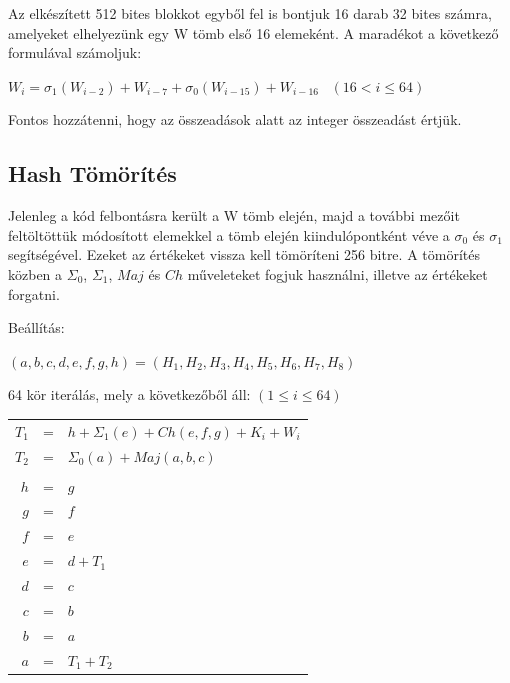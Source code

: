 Az elkészített 512 bites blokkot egyből fel is bontjuk 16 darab 32 bites számra, amelyeket elhelyezünk egy W tömb első 16 elemeként. A maradékot a következő formulával számoljuk:

{\hfil $ W_i = \sigma_1(W_{i-2}) + W_{i-7} + \sigma_0(W_{i-15}) + W_{i-16} \;\;\; (16 < i \leq 64)$ \par}

Fontos hozzátenni, hogy az összeadások alatt az integer összeadást értjük.




\subsection{Hash Tömörítés}

Jelenleg a kód felbontásra került a W tömb elején, majd a további mezőit feltöltöttük módosított elemekkel a tömb elején kiindulópontként véve a $\sigma_0$ és $\sigma_1$ segítségével. Ezeket az értékeket vissza kell tömöríteni 256 bitre. A tömörítés közben a $\Sigma_0$, $\Sigma_1$, $Maj$ és $Ch$ műveleteket fogjuk használni, illetve az értékeket forgatni.

Beállítás:

{\hfil $ (a,b,c,d,e,f,g,h) = (H_1, H_2, H_3, H_4, H_5, H_6, H_7, H_8) $ \par}

64 kör iterálás, mely a következőből áll: $(1 \leq i \leq 64)$

\begin{table}[H]
    \centering
    \begin{tabular}{rcl}

        $T_1$  & = & $ h + \Sigma_1(e) + Ch(e,f,g) + K_i + W_i $ \\
        $T_2$  & = & $ \Sigma_0(a) + Maj(a,b,c) $ \\
          &  &  \\
        $h$  & = & $g$ \\
        $g$  & = & $f$ \\
        $f$  & = & $e$ \\
        $e$  & = & $d + T_1$ \\
        $d$  & = & $c$ \\
        $c$  & = & $b$ \\
        $b$  & = & $a$ \\
        $a$  & = & $T_1 + T_2$ \\
    
    \end{tabular}
\end{table}

